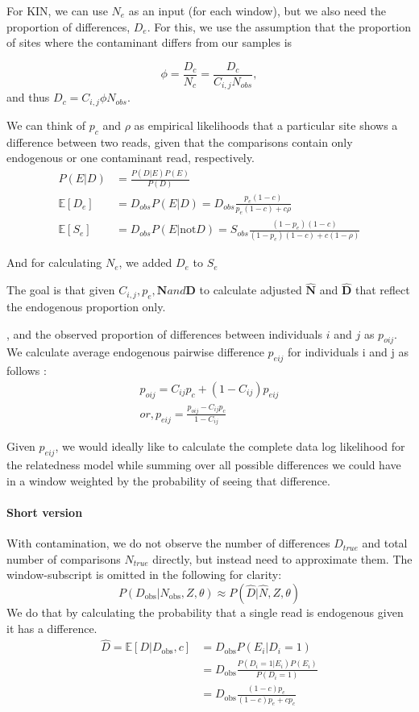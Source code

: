\documentclass[12pt, letterpaper]{article}
\newcommand{\BD}{\mathbf{D}}
\newcommand{\BN}{\mathbf{N}}
\begin{document}
For KIN, we can use $N_e$ as an input (for each window), but we also need the proportion of differences, $D_e$. For this, we use the assumption that the proportion of sites where the contaminant differs from our samples is 

$$\phi = \frac{D_c}{N_c} = \frac{D_c}{C_{i,j} N_{obs}}, $$
and thus $D_c = C_{i,j} \phi N_{obs}$. 

We can think of $p_c$ and $\rho$ as empirical likelihoods that a particular site shows a difference between two reads, given that the comparisons contain only endogenous or one contaminant read, respectively. 
\begin{align}
    P(E|D) &= \frac{P(D|E)P(E)}{P(D)} \nonumber\\
    \mathbb{E}[D_e] &= D_{obs} P(E|D) = D_{obs}\frac{p_e (1-c)}{p_e(1-c) + c\rho}\\
    \mathbb{E}[S_e] &= D_{obs} P(E|\text{not} D) = S_{obs}\frac{(1-p_e)(1-c)}{(1-p_e)(1-c) + c(1-\rho)}
\end{align}

And for calculating $N_{e}$, we added $D_{e}$ to $S_{e}$    

The goal is that given $C_{i,j}, p_e, \BN and \BD$ to calculate adjusted $\hat{\BN}$ and $\hat{\BD}$ that reflect the endogenous proportion only.

, and the observed proportion of differences between individuals $i$ and $j$ as $p_{oij}$. We calculate average endogenous pairwise difference $p_{eij}$ for individuals i and j as follows \cite{noauthor_ancient_nodate}:
\begin{align}
    p_{oij} = C_{ij}  p_c + (1-C_{ij})  p_{eij}\\
    or, p_{eij} = \frac{p_{oij} - C_{ij}  p_c}{1-C_{ij}} 
\end{align}

Given $p_{eij}$, we would ideally like to calculate the complete data log likelihood for the relatedness model while summing over all possible differences we could have in a window weighted by the probability of seeing that difference. 



\paragraph{Short version}
With contamination, we do not observe the number of differences $D_{true}$ and total number of comparisons $N_{true}$ directly, but instead need to approximate them. The window-subscript is omitted in the following for clarity:
\begin{equation}
    P(D_{\text{obs}} | N_\text{obs}, Z, \theta) \approx 
    P( \hat{D} | \hat{N}, Z, \theta)
\end{equation}
We do that by calculating the probability that a single read is endogenous given it has a difference.
\begin{align}
    \hat{D} = \mathbb{E}[D | D_{\text{obs}}, c] &= 
    D_{\text{obs}} P(E_i | D_i=1) \\
    &= D_\text{obs} \frac{P(D_i=1 | E_i)P(E_i)}{P(D_i=1)}\\
    &= D_\text{obs} \frac{(1-c)p_e}{(1-c)p_e + c p_c}
\end{align}
\end{document}
